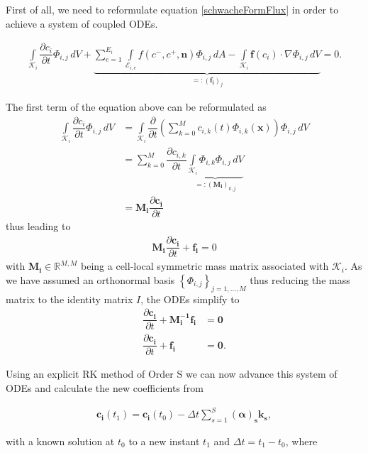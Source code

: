 	First of all, we need to reformulate equation \eqref{schwacheFormFlux} in order to achieve a system of coupled ODEs.
	
	\begin{align*}
		\int\limits_{\mathcal{K}_i} \dfrac{\partial c_i}{\partial t}\Phi_{i,j} \, dV +
		\underbrace{\sum_{e=1}^{E_i}\int\limits_{\mathcal{E}_{i,e}} f \left( c^-, c^+, \mathbf{n} \right) \Phi_{i,j} \, dA - \int\limits_{\mathcal{K}_i} \boldsymbol{f}\left(c_i\right) \cdot \nabla\Phi_{i,j} \, dV}_{=:(\mathbf{f_i})_j} = 0.
	\end{align*}
	
	The first term of the equation above can be reformulated as 
	\begin{align*}
		\int\limits_{\mathcal{K}_i} \dfrac{\partial c_i}{\partial t}\Phi_{i,j} \, dV &= \int\limits_{\mathcal{K}_i} \dfrac{\partial}{\partial t} \left(\sum\limits_{k=0}^{M}c_{i,k}(t)\Phi_{i,k}(\mathbf{x})\right)\Phi_{i,j} \, dV \\
		&= \sum\limits_{k=0}^{M}\dfrac{\partial c_{i,k}}{\partial t}\underbrace{\int\limits_{\mathcal{K}_i}\Phi_{i,k}\Phi_{i,j}\, dV}_{=: (\mathbf{M_i})_{k,j}} \\
		&= \mathbf{M_i} \dfrac{\partial \mathbf{c_i}}{\partial t}
	\end{align*}
	thus leading to 
	\begin{align}
		\mathbf{M_i} \dfrac{\partial \mathbf{c_i}}{\partial t} + \mathbf{f_i} = 0
	\end{align}
	with $\mathbf{M_i}\in \mathbb{R}^{M,M}$ being a cell-local symmetric mass matrix associated with $\mathcal{K}_i$. As we have assumed an orthonormal basis $\left\{\Phi_{i,j}\right\}_{j=1,...,M}$ thus reducing the mass matrix to the identity matrix $I$, the ODEs simplify to
	\begin{align}
		\dfrac{\partial \mathbf{c_i}}{\partial t} + \mathbf{M_i^{-1}f_i}&=\mathbf{0}\\
		\dfrac{\partial \mathbf{c_i}}{\partial t} + \mathbf{f_i}&=\mathbf{0}.	
	\end{align}
	
	Using an explicit RK method of Order S we can now advance this system of ODEs and calculate the new coefficients from
	
	\begin{align}
		\mathbf{c_i}(t_1) = \mathbf{c_i}(t_0)-\Delta t \sum\limits_{s=1}^{S}\mathbf{(\alpha)_s k_s}, 
	\end{align}
	
	with a known solution at $t_0$ to a new instant $t_1$ and $\Delta t = t_1 - t_0$, where
	
